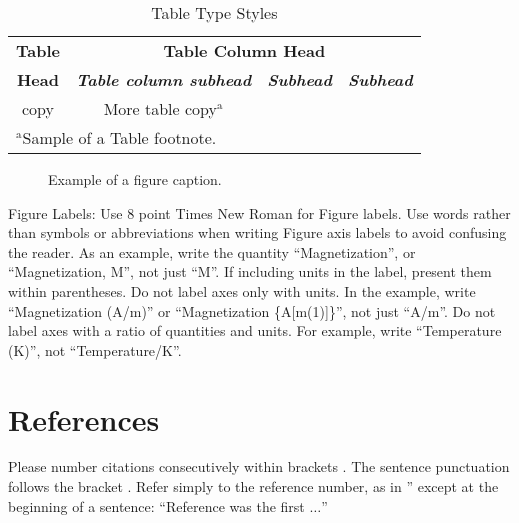 \documentclass[conference]{IEEEtran}
\begin{document}
    \begin{table}[htbp]
        \caption{Table Type Styles}
            \begin{center}
                \begin{tabular}{|c|c|c|c|}
                    \hline
                    \textbf{Table}&\multicolumn{3}{|c|}{\textbf{Table Column Head}} \\
                    \cline{2-4} 
                    \textbf{Head} & \textbf{\textit{Table column subhead}}& \textbf{\textit{Subhead}}& \textbf{\textit{Subhead}} \\
                    \hline
                    copy& More table copy$^{\mathrm{a}}$& &  \\
                    \hline
                    \multicolumn{4}{l}{$^{\mathrm{a}}$Sample of a Table footnote.}
                \end{tabular}
            \label{tab1}
        \end{center}
    \end{table}

    \begin{figure}[htbp]
        \caption{Example of a figure caption.}
        \label{fig}
    \end{figure}

    Figure Labels: Use 8 point Times New Roman for Figure labels. Use words 
    rather than symbols or abbreviations when writing Figure axis labels to 
    avoid confusing the reader. As an example, write the quantity 
    ``Magnetization'', or ``Magnetization, M'', not just ``M''. If including 
    units in the label, present them within parentheses. Do not label axes only 
    with units. In the example, write ``Magnetization (A/m)'' or ``Magnetization 
    \{A[m(1)]\}'', not just ``A/m''. Do not label axes with a ratio of 
    quantities and units. For example, write ``Temperature (K)'', not 
    ``Temperature/K''.


\section*{References}

Please number citations consecutively within brackets . The 
sentence punctuation follows the bracket . Refer simply to the reference 
number, as in '' except 
at the beginning of a sentence: ``Reference  was the first $\ldots$''
\end{document}
